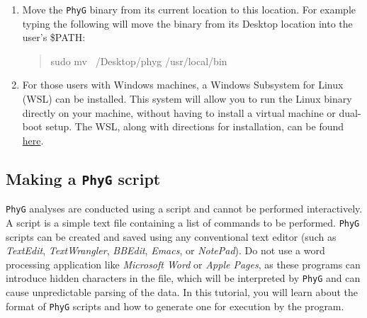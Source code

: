 \documentclass[]{article}
\newcommand{\phyg}{\texttt{PhyG} }
\begin{document}
\begin{enumerate}
	\begin{quote}
  	/Applications/phyg ~/Desktop/phygfiles/run1.pg
	\end{quote}
	
See also below in Subsection \ref{subsec:executing}.
	
\item Move the \phyg binary from its current location to this location. For example 
typing the following will move the binary from its Desktop location into the user's 
\$PATH:

	\begin{quote}
	sudo mv ~/Desktop/phyg /usr/local/bin
	\end{quote}	
	
\item For those users with Windows machines, a Windows Subsystem for Linux 
(WSL) can be installed. This system will allow you to run the Linux binary directly 
on your machine, without having to install a virtual machine or dual-boot setup. 
The WSL, along with directions for installation, can be found 
\href{https://learn.microsoft.com/en-us/windows/wsl/}{here}.
\end{enumerate}

\subsection{Making a \phyg script}
\label{subsec:Scripts}

\phyg analyses are conducted using a script and cannot be performed interactively. 
A script is a simple text file containing a list of commands to be performed. \phyg 
scripts can be created and saved using any conventional text editor (such as 
\textit{TextEdit}, \textit{TextWrangler}, \textit{BBEdit}, \textit{Emacs}, or \textit{NotePad}). 
Do not use a word processing application like \textit{Microsoft Word} or \textit{Apple 
Pages}, as these programs can introduce hidden characters in the file, which will be 
interpreted by \phyg and can cause unpredictable parsing of the data. In this tutorial, 
you will learn about the format of \phyg scripts and how to generate one for execution 
by the program.
\end{document}
